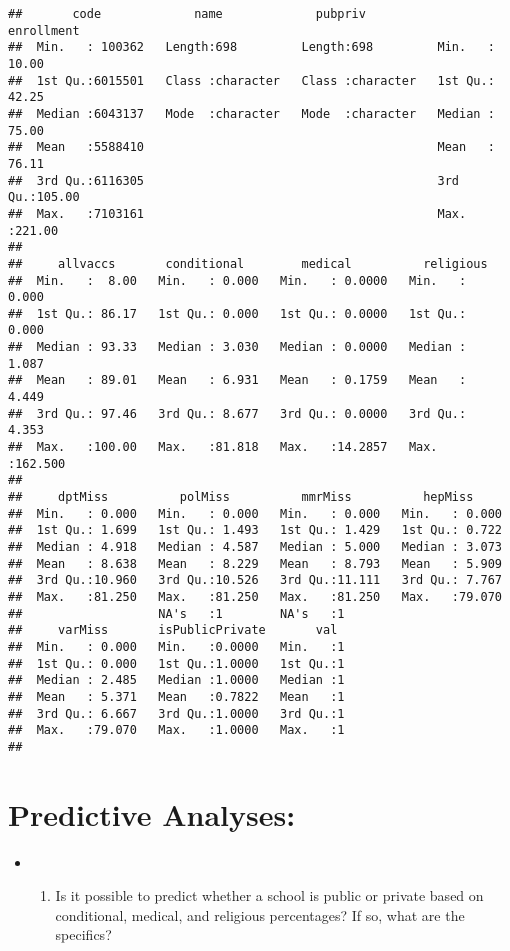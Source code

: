 \documentclass[]{article}
\providecommand{\tightlist}{%
  \setlength{\itemsep}{0pt}\setlength{\parskip}{0pt}}
\begin{document}
\begin{verbatim}
##       code             name             pubpriv            enrollment    
##  Min.   : 100362   Length:698         Length:698         Min.   : 10.00  
##  1st Qu.:6015501   Class :character   Class :character   1st Qu.: 42.25  
##  Median :6043137   Mode  :character   Mode  :character   Median : 75.00  
##  Mean   :5588410                                         Mean   : 76.11  
##  3rd Qu.:6116305                                         3rd Qu.:105.00  
##  Max.   :7103161                                         Max.   :221.00  
##                                                                          
##     allvaccs       conditional        medical          religious      
##  Min.   :  8.00   Min.   : 0.000   Min.   : 0.0000   Min.   :  0.000  
##  1st Qu.: 86.17   1st Qu.: 0.000   1st Qu.: 0.0000   1st Qu.:  0.000  
##  Median : 93.33   Median : 3.030   Median : 0.0000   Median :  1.087  
##  Mean   : 89.01   Mean   : 6.931   Mean   : 0.1759   Mean   :  4.449  
##  3rd Qu.: 97.46   3rd Qu.: 8.677   3rd Qu.: 0.0000   3rd Qu.:  4.353  
##  Max.   :100.00   Max.   :81.818   Max.   :14.2857   Max.   :162.500  
##                                                                       
##     dptMiss          polMiss          mmrMiss          hepMiss      
##  Min.   : 0.000   Min.   : 0.000   Min.   : 0.000   Min.   : 0.000  
##  1st Qu.: 1.699   1st Qu.: 1.493   1st Qu.: 1.429   1st Qu.: 0.722  
##  Median : 4.918   Median : 4.587   Median : 5.000   Median : 3.073  
##  Mean   : 8.638   Mean   : 8.229   Mean   : 8.793   Mean   : 5.909  
##  3rd Qu.:10.960   3rd Qu.:10.526   3rd Qu.:11.111   3rd Qu.: 7.767  
##  Max.   :81.250   Max.   :81.250   Max.   :81.250   Max.   :79.070  
##                   NA's   :1        NA's   :1                        
##     varMiss       isPublicPrivate       val   
##  Min.   : 0.000   Min.   :0.0000   Min.   :1  
##  1st Qu.: 0.000   1st Qu.:1.0000   1st Qu.:1  
##  Median : 2.485   Median :1.0000   Median :1  
##  Mean   : 5.371   Mean   :0.7822   Mean   :1  
##  3rd Qu.: 6.667   3rd Qu.:1.0000   3rd Qu.:1  
##  Max.   :79.070   Max.   :1.0000   Max.   :1  
## 
\end{verbatim}

\hypertarget{predictive-analyses-1}{%
\section{Predictive Analyses:}\label{predictive-analyses-1}}

\begin{itemize}
\item
  \begin{enumerate}
  \def\labelenumi{\arabic{enumi}.}
  \setcounter{enumi}{8}
  \tightlist
  \item
    Is it possible to predict whether a school is public or private
    based on conditional, medical, and religious percentages? If so,
    what are the specifics?
  \end{enumerate}
\end{itemize}
\end{document}
